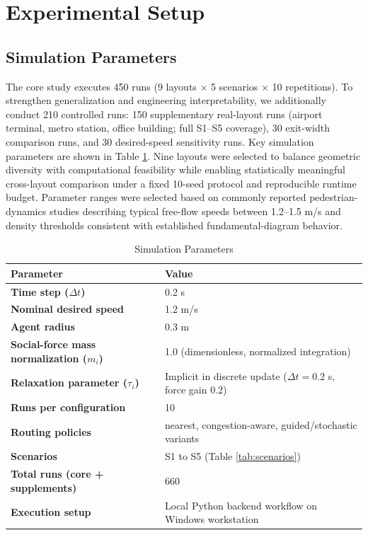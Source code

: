 \documentclass[nolineno]{ieeeaccess}
\begin{document}
\section{Experimental Setup}
\subsection{Simulation Parameters}
The core study executes 450 runs (9 layouts $\times$ 5 scenarios $\times$ 10 repetitions). To strengthen generalization and engineering interpretability, we additionally conduct 210 controlled runs: 150 supplementary real-layout runs (airport terminal, metro station, office building; full S1--S5 coverage), 30 exit-width comparison runs, and 30 desired-speed sensitivity runs. Key simulation parameters are shown in Table \ref{tab:sim_params}.
Nine layouts were selected to balance geometric diversity with computational feasibility while enabling statistically meaningful cross-layout comparison under a fixed 10-seed protocol and reproducible runtime budget.
Parameter ranges were selected based on commonly reported pedestrian-dynamics studies describing typical free-flow speeds between 1.2--1.5 m/s and density thresholds consistent with established fundamental-diagram behavior.

\begin{table}[t]
\centering
\caption{Simulation Parameters}
\label{tab:sim_params}
{\footnotesize
\setlength{\tabcolsep}{3pt}
\begin{tabular}{>{\bfseries}p{2.25cm} p{4.55cm}}
\toprule
Parameter & Value \\
\midrule
Time step ($\Delta t$) & 0.2 s \\
Nominal desired speed & 1.2 m/s \\
Agent radius & 0.3 m \\
Social-force mass normalization ($m_i$) & 1.0 (dimensionless, normalized integration) \\
Relaxation parameter ($\tau_i$) & Implicit in discrete update ($\Delta t=0.2$ s, force gain 0.2) \\
Runs per configuration & 10 \\
Routing policies & nearest, congestion-aware, guided/stochastic variants \\
Scenarios & S1 to S5 (Table \ref{tab:scenarios}) \\
Total runs (core + supplements) & 660 \\
Execution setup & Local Python backend workflow on Windows workstation \\
\bottomrule
\end{tabular}
}
\end{table}
\end{document}

